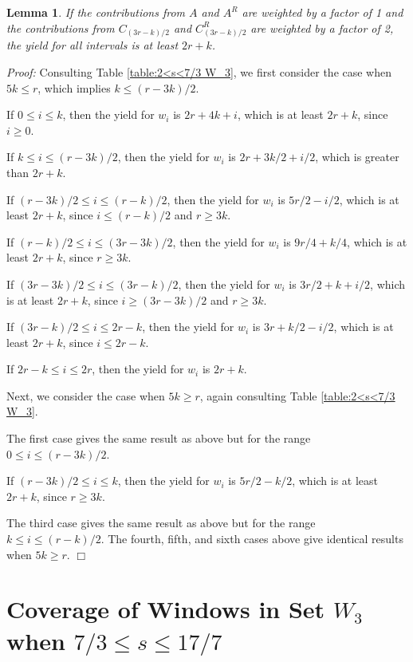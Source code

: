 \documentclass[11pt]{article}
\newtheorem{lemma}{Lemma}[section]
\newcommand\QED{\ifhmode\allowbreak\else\nobreak\fi
\quad\nobreak$\Box$\medbreak}
\newcommand{\proofstart}{\par\noindent \emph{Proof:} }
\newcommand{\proofend}{\QED\par}
\newenvironment{proof}{\proofstart}{\proofend}
\begin{document}
\begin{lemma}\label{lemma:lowestinterval 2<s<7/3 W_3}
If the contributions from $A$ and $A^R$ are weighted by a factor of 1 and the contributions from $C_{(3r - k)/2}$ and $C_{(3r - k)/2}^R$ are weighted by a factor of 2, the yield for all intervals is at least $2r + k$.
\end{lemma}

\begin{proof}
Consulting Table \ref{table:2<s<7/3 W_3}, we first consider the case when $5k \leq r$, which implies $k \leq (r - 3k)/2$.

If $0 \leq i \leq k$, then the yield for $w_i$ is $2r + 4k + i$, which is at least $2r + k$, since $i \geq 0$.

If $k \leq i \leq (r - 3k)/2$, then the yield for $w_i$ is $2r + 3k/2 + i/2$, which is greater than $2r + k$.

If $(r - 3k)/2 \leq i \leq (r - k)/2$, then the yield for $w_i$ is $5r/2 - i/2$, which is at least $2r + k$, since $i \leq (r - k)/2$ and $r \geq 3k$.

If $(r - k)/2 \leq i \leq (3r - 3k)/2$, then the yield for $w_i$ is $9r/4 + k/4$, which is at least $2r + k$, since $r \geq 3k$.

If $(3r - 3k)/2 \leq i \leq (3r - k)/2$, then the yield for $w_i$ is $3r/2 + k + i/2$, which is at least $2r + k$, since  $i \geq (3r - 3k)/2$ and $r \geq 3k$.

If $(3r - k)/2 \leq i \leq 2r - k$, then the yield for $w_i$ is $3r + k/2 - i/2$, which is at least $2r + k$, since $i \leq 2r - k$.

If $2r - k \leq i \leq 2r$, then the yield for $w_i$ is $2r + k$.

Next, we consider the case when $5k \geq r$, again consulting Table \ref{table:2<s<7/3 W_3}.

The first case gives the same result as above but for the range $0 \leq i \leq (r - 3k)/2$.  

If $(r - 3k)/2 \leq i \leq k$, then the yield for $w_i$ is $5r/2 - k/2$, which is at least $2r + k$, since $r \geq 3k$.

The third case gives the same result as above but for the range $k \leq i \leq (r - k)/2$.  The fourth, fifth, and sixth cases above give identical results when $5k \geq r$.
\end{proof}


\section{Coverage of Windows in Set $W_3$ when $7/3 \leq s \leq 17/7$}
\label{appendix:7/3<s<17/7 W_3}
\end{document}
